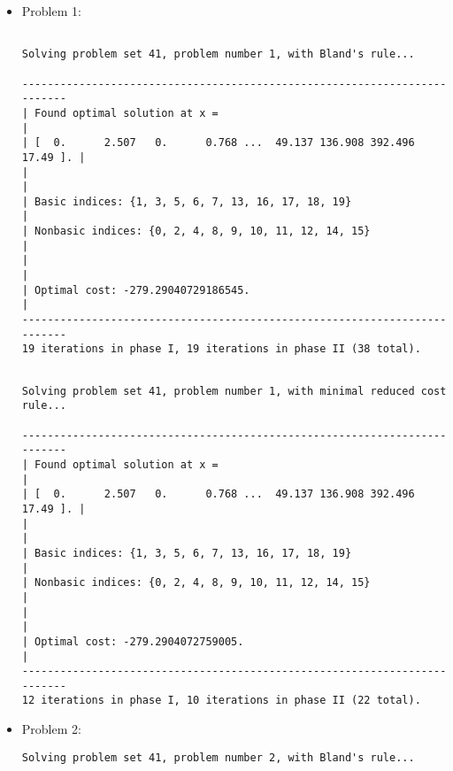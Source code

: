 \documentclass[a4paper]{article}
\begin{document}
\begin{itemize}
    \item Problem 1:
\begin{verbatim}

Solving problem set 41, problem number 1, with Bland's rule...

--------------------------------------------------------------------------
| Found optimal solution at x =                                          |
| [  0.      2.507   0.      0.768 ...  49.137 136.908 392.496  17.49 ]. |
|                                                                        |
| Basic indices: {1, 3, 5, 6, 7, 13, 16, 17, 18, 19}                     |
| Nonbasic indices: {0, 2, 4, 8, 9, 10, 11, 12, 14, 15}                  |
|                                                                        |
| Optimal cost: -279.29040729186545.                                     |
--------------------------------------------------------------------------
19 iterations in phase I, 19 iterations in phase II (38 total).
\end{verbatim}

\vspace{2ex}
\begin{verbatim}

Solving problem set 41, problem number 1, with minimal reduced cost rule...

--------------------------------------------------------------------------
| Found optimal solution at x =                                          |
| [  0.      2.507   0.      0.768 ...  49.137 136.908 392.496  17.49 ]. |
|                                                                        |
| Basic indices: {1, 3, 5, 6, 7, 13, 16, 17, 18, 19}                     |
| Nonbasic indices: {0, 2, 4, 8, 9, 10, 11, 12, 14, 15}                  |
|                                                                        |
| Optimal cost: -279.2904072759005.                                      |
--------------------------------------------------------------------------
12 iterations in phase I, 10 iterations in phase II (22 total).
\end{verbatim}

\vspace{2ex}
\newpage
    \item Problem 2:
\begin{verbatim}
Solving problem set 41, problem number 2, with Bland's rule...


\end{verbatim}
\end{itemize}
\end{document}

